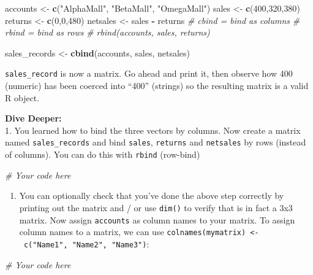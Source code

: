 \documentclass[]{article}
\newenvironment{Shaded}{\begin{snugshade}}{\end{snugshade}}
\newcommand{\CommentTok}[1]{\textcolor[rgb]{0.56,0.35,0.01}{\textit{#1}}}
\newcommand{\DecValTok}[1]{\textcolor[rgb]{0.00,0.00,0.81}{#1}}
\newcommand{\KeywordTok}[1]{\textcolor[rgb]{0.13,0.29,0.53}{\textbf{#1}}}
\newcommand{\NormalTok}[1]{#1}
\newcommand{\OperatorTok}[1]{\textcolor[rgb]{0.81,0.36,0.00}{\textbf{#1}}}
\newcommand{\StringTok}[1]{\textcolor[rgb]{0.31,0.60,0.02}{#1}}
\providecommand{\tightlist}{%
  \setlength{\itemsep}{0pt}\setlength{\parskip}{0pt}}
\begin{document}
\begin{Shaded}
\begin{Highlighting}[]
\NormalTok{accounts <-}\StringTok{ }\KeywordTok{c}\NormalTok{(}\StringTok{"AlphaMall"}\NormalTok{, }\StringTok{"BetaMall"}\NormalTok{, }\StringTok{"OmegaMall"}\NormalTok{)}
\NormalTok{sales <-}\StringTok{ }\KeywordTok{c}\NormalTok{(}\DecValTok{400}\NormalTok{,}\DecValTok{320}\NormalTok{,}\DecValTok{380}\NormalTok{)}
\NormalTok{returns <-}\StringTok{ }\KeywordTok{c}\NormalTok{(}\DecValTok{0}\NormalTok{,}\DecValTok{0}\NormalTok{,}\DecValTok{480}\NormalTok{)}
\NormalTok{netsales <-}\StringTok{ }\NormalTok{sales }\OperatorTok{-}\StringTok{ }\NormalTok{returns}
\CommentTok{# cbind = bind as columns}
\CommentTok{# rbind = bind as rows}
\CommentTok{# rbind(accounts, sales, returns)}

\NormalTok{sales_records <-}\StringTok{ }\KeywordTok{cbind}\NormalTok{(accounts, sales, netsales)}
\end{Highlighting}
\end{Shaded}

\texttt{sales\_record} is now a matrix. Go ahead and print it, then
observe how 400 (numeric) has been coerced into ``400'' (strings) so the
resulting matrix is a valid R object.

\textbf{Dive Deeper:}\\
1. You learned how to bind the three vectors by columns. Now create a
matrix named \texttt{sales\_records} and bind \texttt{sales},
\texttt{returns} and \texttt{netsales} by rows (instead of columns). You
can do this with \texttt{rbind} (row-bind)

\begin{Shaded}
\begin{Highlighting}[]
\CommentTok{# Your code here}
\end{Highlighting}
\end{Shaded}

\begin{enumerate}
\def\labelenumi{\arabic{enumi}.}
\setcounter{enumi}{1}
\tightlist
\item
  You can optionally check that you've done the above step correctly by
  printing out the matrix and / or use \texttt{dim()} to verify that is
  in fact a 3x3 matrix. Now assign \texttt{accounts} as column names to
  your matrix. To assign column names to a matrix, we can use
  \texttt{colnames(mymatrix)\ \textless{}-\ c("Name1",\ "Name2",\ "Name3")}:
\end{enumerate}

\begin{Shaded}
\begin{Highlighting}[]
\CommentTok{# Your code here}
\end{Highlighting}
\end{Shaded}
\end{document}

